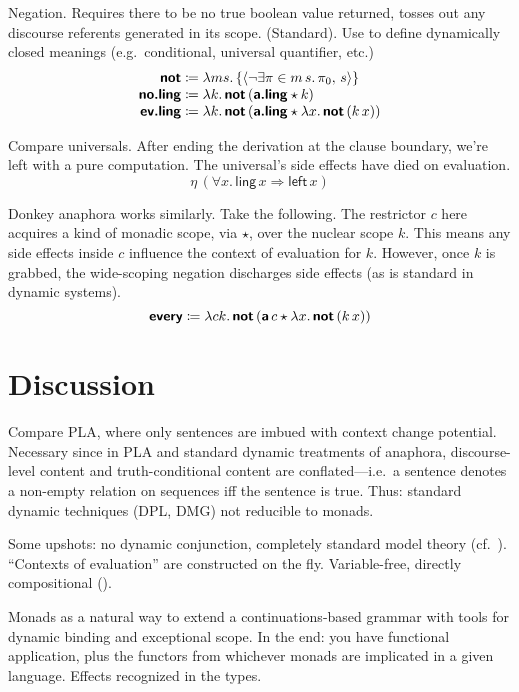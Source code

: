 	Negation. Requires there to be no true boolean value returned, tosses out any discourse referents generated in its scope. (Standard). Use to define dynamically closed meanings (e.g.~conditional, universal quantifier, etc.) %
	\[\begin{array}{r@{}l}
		\bsf{not}&{}\ceq \lambda ms.\left\{\ab{\neg\exists \pi \in m\,s.\,\pi_0,\,s}\right\}%
		\\
		\bsf{no.ling}&{}\ceq \lambda k.\,\bsf{not}\,(\bsf{a.ling} \star k)%
		\\
		\bsf{ev.ling}&{}\ceq \lambda k.\,\bsf{not}\,(\bsf{a.ling} \star \lambda x.\,\bsf{not}\,(k\,x))%
	\end{array}\]%
	
	Compare universals. After ending the derivation at the clause boundary, we're left with a pure computation. The universal's side effects have died on evaluation.%
	\[\eta\,(\forall x.\,\textsf{ling}\,x \Rightarrow \textsf{left}\,x)\]
	
	Donkey anaphora works similarly. Take the following. The restrictor $c$ here acquires a kind of monadic scope, via $\star$, over the nuclear scope $k$. This means any side effects inside $c$ influence the context of evaluation for $k$. However, once $k$ is grabbed, the wide-scoping negation discharges side effects (as is standard in dynamic systems). %
	\[\textbf{\textsf{every}} \coloneqq \lambda ck.\,\textbf{\textsf{not}}\,(\textbf{\textsf{a}}\,c \star \lambda x.\,\textbf{\textsf{not}}\,(k\,x))\]%

\section{Discussion}
	Compare PLA, where only sentences are imbued with context change potential. Necessary since in PLA and standard dynamic treatments of anaphora, discourse-level content and truth-conditional content are conflated---i.e.~a sentence denotes a non-empty relation on sequences iff the sentence is true. Thus: standard dynamic techniques (DPL, DMG) not reducible to monads. %
	
	Some upshots: no dynamic conjunction, completely standard model theory (cf.~\citealt{Groote:2006}). ``Contexts of evaluation'' are constructed on the fly. Variable-free, directly compositional (\citealt{Jacobson:1999}). %

	Monads as a natural way to extend a continuations-based grammar with tools for dynamic binding and exceptional scope. In the end: you have functional application, plus the functors from whichever monads are implicated in a given language. Effects recognized in the types. %

